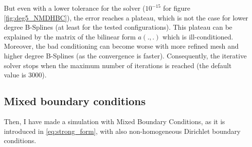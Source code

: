 \documentclass[a4paper,12pt,twoside]{report}
\begin{document}
But even with a lower tolerance for the solver ($10^{-15}$ for figure \ref{fig:deg5_NMDHBC}), the error reaches a plateau, which is not the case for lower degree B-Splines (at least for the tested configurations). This plateau can be explained by the matrix of the bilinear form $a(.,.)$ which is ill-conditioned. Moreover, the bad conditioning can become worse with more refined mesh and higher degree B-Splines (as the convergence is faster). Consequently, the iterative solver stops when the maximum number of iterations is reached (the default value is $3000$).

\subsection{Mixed boundary conditions}
\label{sec:mixed_BC}

Then, I have made a simulation with Mixed Boundary Conditions, as it is introduced in \eqref{eq:strong_form}, with also non-homogeneous Dirichlet boundary conditions.
\end{document}
